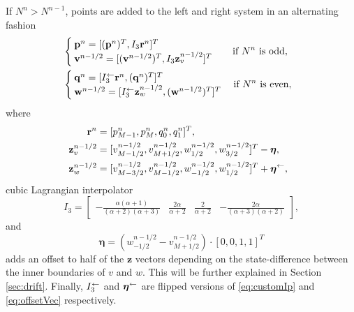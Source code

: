 If $N^n>N^{n-1}$, points are added to the left and right system in an alternating fashion 
\begin{equation}\label{eq:addingPoint}
    \begin{aligned}
        \!\!\!\!\!&\begin{cases}
            \mathbf{p}^n = [(\mathbf{p}^n)^T, I_3\mathbf{r}^n]^T\\
            \mathbf{v}^{n-1/2} = [(\mathbf{v}^{n-1/2})^T, I_3\mathbf{z}_v^{n-1/2}]^T
        \end{cases}
        \quad\!\text{if $N^n $ is odd},\\
        \!\!\!\!\!&\begin{cases}
            \mathbf{q}^n = [I_3^\flip\mathbf{r}^n, (\mathbf{q}^n)^T]^T\\
            \mathbf{w}^{n-1/2} = [ I_3^\flip\mathbf{z}_w^{n-1/2},(\mathbf{w}^{n-1/2})^T]^T
        \end{cases}\text{if $ N^n$ is even},
    \end{aligned}
\end{equation}
where
\begin{equation}\label{eq:interpVecs}
    \begin{aligned}
        \!\!\!\!\mathbf{r}^n &= [p_{M-1}^n, p_M^n, q_0^n, q_1^n]^T,\\
        \!\!\!\!\mathbf{z}_v^{n-1/2} &= [v_{M-1/2}^{n-1/2}, v_{M+1/2}^{n-1/2}, w_{1/2}^{n-1/2}, w_{3/2}^{n-1/2}]^T - \boldsymbol{\eta},\\
        \!\!\!\!\mathbf{z}_w^{n-1/2} &= [v_{M-3/2}^{n-1/2}, v_{M-1/2}^{n-1/2}, w_{-1/2}^{n-1/2}, w_{1/2}^{n-1/2}]^T+ \boldsymbol{\eta}^{\flip},%
    \end{aligned}
\end{equation}
cubic Lagrangian interpolator
\begin{equation}\label{eq:customIp}
    I_3 = \begin{bmatrix} -\frac{\alpha(\alpha+1)}{(\alpha+2)(\alpha+3)} &\frac{2\alpha}{\alpha+2} &\frac{2}{\alpha+2} 
    &-\frac{2\alpha}{(\alpha+3)(\alpha+2)}
    \end{bmatrix},
\end{equation}
and 
\begin{equation}\label{eq:offsetVec}
    \boldsymbol{\eta} = \left(w_{-1/2}^{n-1/2}-v_{M+1/2}^{n
    -1/2}\right)\cdot[0, 0, 1, 1]^T 
\end{equation}
adds an offset to half of the $\mathbf{z}$ vectors depending on the state-difference between the inner boundaries of $v$ and $w$. This will be further explained in Section \ref{sec:drift}. Finally, $I_3^\leftarrow$ and $\boldsymbol{\eta}^{\leftarrow}$ are flipped versions of \eqref{eq:customIp} and \eqref{eq:offsetVec} respectively.

